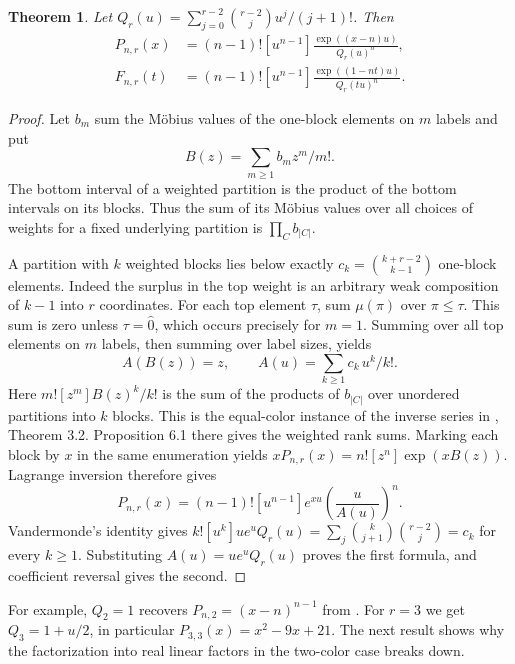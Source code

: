 \documentclass[11pt]{article}
\newtheorem{theorem}{Theorem}
\begin{document}
\begin{theorem}\label{main}
Let $Q_r(u)=\sum_{j=0}^{r-2}\binom{r-2}{j}u^j/(j+1)!$. Then
\begin{align*}
 P_{n,r}(x)&=(n-1)![u^{n-1}]\frac{\exp((x-n)u)}{Q_r(u)^n},\\
 F_{n,r}(t)&=(n-1)![u^{n-1}]\frac{\exp((1-nt)u)}{Q_r(tu)^n}.
\end{align*}
\end{theorem}
\begin{proof}
Let $b_m$ sum the M\"obius values of the one-block elements on $m$ labels and put
\[
 B(z)=\sum_{m\ge1}b_mz^m/m!.
\]
The bottom interval of a weighted partition is the
product of the bottom intervals on its blocks. Thus the sum of its M\"obius values
over all choices of weights for a fixed underlying partition is $\prod_C b_{|C|}$.

A partition with $k$ weighted blocks lies below exactly
$c_k=\binom{k+r-2}{k-1}$ one-block elements. Indeed the surplus in the top weight
is an arbitrary weak composition of $k-1$ into $r$ coordinates. For each top
element $\tau$, sum $\mu(\pi)$ over $\pi\le\tau$. This sum is zero unless
$\tau=\hat0$, which occurs precisely for $m=1$. Summing over all top elements
on $m$ labels, then summing over label sizes, yields
\[
 A(B(z))=z,\qquad A(u)=\sum_{k\ge1}c_k\,u^k/k!.
\]
Here $m![z^m]B(z)^k/k!$ is the sum of the products of $b_{|C|}$ over unordered
partitions into $k$ blocks. This is the equal-color instance of the inverse series
in \cite{multiple}, Theorem 3.2. Proposition 6.1 there gives the weighted rank sums. Marking each block by $x$ in the same enumeration yields
$xP_{n,r}(x)=n![z^n]\exp(xB(z))$. Lagrange inversion therefore gives
\[
 P_{n,r}(x)=(n-1)![u^{n-1}]e^{xu}\left(\frac{u}{A(u)}\right)^n .
\]
Vandermonde's identity gives
$k![u^k]ue^uQ_r(u)=\sum_j\binom{k}{j+1}\binom{r-2}{j}=c_k$ for every $k\ge1$.
Substituting $A(u)=ue^uQ_r(u)$ proves the first formula, and coefficient reversal
gives the second.
\end{proof}

For example, $Q_2=1$ recovers $P_{n,2}=(x-n)^{n-1}$ from \cite{two}.
For $r=3$ we get $Q_3=1+u/2$, in particular
$P_{3,3}(x)=x^2-9x+21$. The next result shows why the factorization into
real linear factors in the two-color case breaks down.
\end{document}
